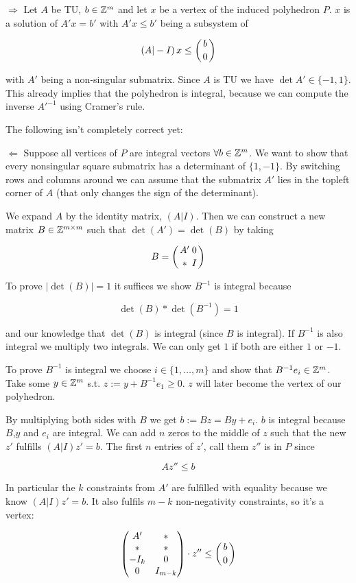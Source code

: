 \begin{pr} $\Rightarrow$ Let $A$ be TU, $b\in \mathbb{Z}^m$ and let $x$ be a vertex of the induced polyhedron $P$. $x$ is a solution of $A'x=b'$ with $A'x\leq b'$ being a subsystem of 

\[\left(A|-I\right) x \leq \left(b\atop 0\right)\]

with $A'$ being a non-singular submatrix. Since $A$ is TU we have $\det A'\in \{-1,1\}$. This already implies that the polyhedron is integral, because we can compute the inverse $A'^{-1}$ using Cramer's rule. %


The following isn't completely correct yet:

$\Leftarrow$ Suppose all vertices of $P$ are integral vectors $\forall b\in \mathbb{Z}^m$. We want to show that every nonsingular square submatrix has a determinant of $\{1,-1\}$. By switching rows and columns around we can assume that the submatrix $A'$ lies in the topleft corner of $A$ (that only changes the sign of the determinant). 

We expand $A$ by the identity matrix, $(A|I)$. Then we can construct a new matrix $B\in \mathbb{Z}^{m\times m}$ such that $\det (A') = \det (B)$ by taking 

\[B = \left({A' \atop *} {0\atop I}\right)\]

To prove $|\det (B)| =1$ it suffices we show $B^{-1}$ is integral because

\[\det(B)*\det(B^{-1}) = 1\]

and our knowledge that $\det (B)$ is integral (since $B$ is integral). If $B^{-1}$ is also integral we multiply two integrals. We can only get $1$ if both are either $1$ or $-1$.

To prove $B^{-1}$ is integral we choose $i\in \{1,\ldots, m\}$ and show that $B^{-1}e_i\in \mathbb{Z}^m$. Take some $y\in \mathbb{Z}^m$ s.t. $z:= y + B^{-1}e_1\geq 0$. $z$ will later become the vertex of our polyhedron. 

By multiplying both sides with $B$ we get $b:= Bz=By+e_i$. $b$ is integral because $B$,$y$ and $e_i$ are integral. We can add $n$ zeros to the middle of $z$ such that the new $z'$ fulfills $(A|I)z'=b$. The first $n$ entries of $z'$, call them $z''$ is in $P$ since

\[Az''\leq b\]

In particular the $k$ constraints from $A'$ are fulfilled with equality because we know $(A|I)z'=b$. It also fulfils $m-k$ non-negativity constraints, so it's a vertex:

\[\begin{pmatrix}
A' & *\\
* & *\\
-I_k & 0 \\
0 & I_{m-k}
\end{pmatrix} \cdot z'' \leq \left(b \atop 0\right)\]


\end{pr}
